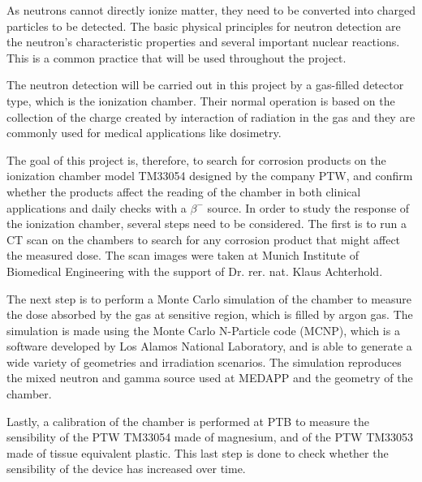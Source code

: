 As neutrons cannot directly ionize matter, they need to be converted into charged particles to be detected. The basic physical principles for neutron detection are the neutron’s characteristic properties and several important nuclear reactions. This is a common practice that will be used throughout the project.

The neutron detection will be carried out in this project by a gas-filled detector type, which is the ionization chamber. Their normal operation is based on the collection of the charge created by interaction of radiation in the gas and they are commonly used for medical applications like dosimetry.

The goal of this project is, therefore, to search for corrosion products on the ionization chamber model TM33054 designed by the company PTW, and confirm whether the products affect the reading of the chamber in both clinical applications and daily checks with a $\beta^-$ source. In order to study the response of the ionization chamber, several steps need to be considered. The first is to run a CT scan on the chambers to search for any corrosion product that might affect the measured dose. The scan images were taken at Munich Institute of Biomedical Engineering with the support of Dr. rer. nat. Klaus Achterhold.

The next step is to perform a Monte Carlo simulation of the chamber to measure the dose absorbed by the gas at sensitive region, which is filled by argon gas. The simulation is made using the Monte Carlo N-Particle code (MCNP), which is a software developed by Los Alamos National Laboratory, and is able to generate a wide variety of geometries and irradiation scenarios. The simulation reproduces the mixed neutron and gamma source used at MEDAPP and the geometry of the chamber.

Lastly, a calibration of the chamber is performed at PTB to measure the sensibility of the PTW TM33054 made of magnesium, and of the PTW TM33053 made of tissue equivalent plastic. This last step is done to check whether the sensibility of the device has increased over time.